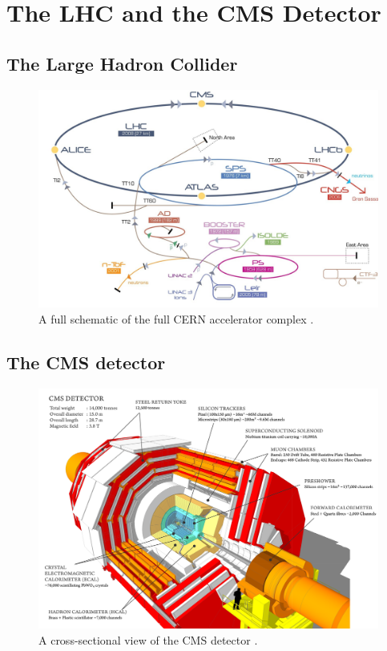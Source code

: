 \chapter{The LHC and the CMS Detector} \label{chap-detector}

\section{The Large Hadron Collider} \label{sec-TheLargeHadronCollider}

\begin{figure}\label{fig-CERNAcceleratorComplex}
\includegraphics[width=\textwidth]{Figures/CERNAcceleratorComplex.jpg}
\caption{A full schematic of the full CERN accelerator complex \cite{ref-}.}
\end{figure}

\section{The CMS detector} \label{sec-TheCMSDetector}

\begin{figure}\label{fig-CMSDetector}
\includegraphics[width=\textwidth]{Figures/CMSDetector.png}
\caption{A cross-sectional view of the CMS detector \cite{ref-}.}
\end{figure}

